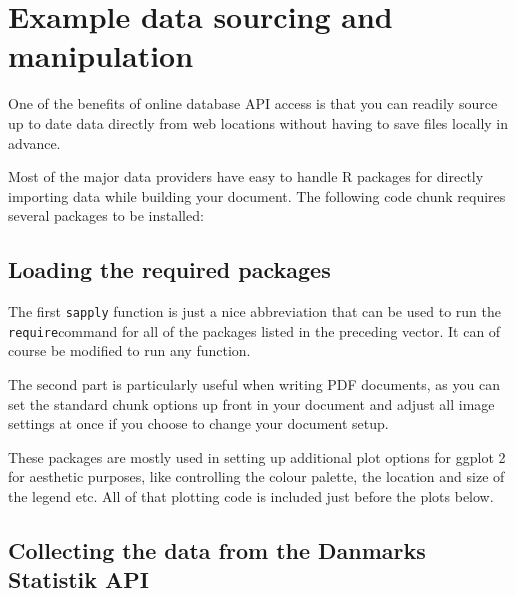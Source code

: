 \documentclass[
]{book}
\begin{document}
\hypertarget{example-data-sourcing-and-manipulation}{%
\section{Example data sourcing and manipulation}\label{example-data-sourcing-and-manipulation}}

One of the benefits of online database API access is that you can readily source up to date data directly from web locations without having to save files locally in advance.

Most of the major data providers have easy to handle R packages for directly importing data while building your document. The following code chunk requires several packages to be installed:

\hypertarget{loading-the-required-packages}{%
\subsection{Loading the required packages}\label{loading-the-required-packages}}

The first \texttt{sapply} function is just a nice abbreviation that can be used to run the \texttt{require}command for all of the packages listed in the preceding vector. It can of course be modified to run any function.

The second part is particularly useful when writing PDF documents, as you can set the standard chunk options up front in your document and adjust all image settings at once if you choose to change your document setup.

These packages are mostly used in setting up additional plot options for ggplot 2 for aesthetic purposes, like controlling the colour palette, the location and size of the legend etc. All of that plotting code is included just before the plots below.

\hypertarget{collecting-the-data-from-the-danmarks-statistik-api}{%
\subsection{Collecting the data from the Danmarks Statistik API}\label{collecting-the-data-from-the-danmarks-statistik-api}}
\end{document}

